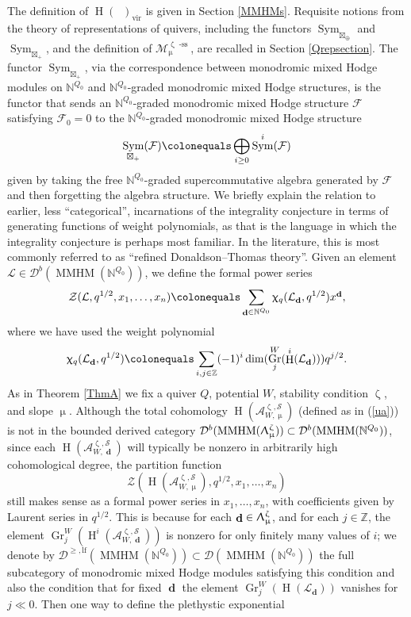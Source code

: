 \documentclass[a4paper,10pt]{amsart}
\renewcommand{\zeta}{\upzeta}
\renewcommand{\chi}{\upchi}
\renewcommand{\Lambda}{\Uplambda}
\renewcommand{\mu}{\upmu}
\DeclareMathOperator{\BC}{B\mathbb{C}^*}
\newcommand{\SP}{\mathcal{S}}
\newcommand{\Msp}{\mathcal{M}}
\newcommand{\GrW}[1]{\Gr^W_{#1}}
\DeclareMathOperator{\sst}{-ss}
\DeclareMathOperator{\MMHM}{MMHM}
\DeclareMathOperator{\Gr}{Gr}
\DeclareMathOperator{\dd}{\mathbf{d}}
\DeclareMathOperator{\Sym}{Sym}
\DeclareMathOperator{\vir}{vir}
\DeclareMathOperator{\HO}{H}
\newcommand{\Dulf}{\mathcal{D}^{\geq, \mathrm{lf}}}
\newcommand{\Db}{\mathcal{D}^{b}}
\newcommand{\Dub}{\mathcal{D}}
\begin{document}
The definition of $\HO(\BC)_{\vir}$ is given in Section \ref{MMHMs}.  Requisite notions from the theory of representations of quivers, including the functors $\Sym_{\boxtimes_{\oplus}}$ and $\Sym_{\boxtimes_{+}}$, and the definition of $\Msp^{\zeta\sst}_{\mu}$, are recalled in Section \ref{Qrepsection}.  The functor $\Sym_{\boxtimes_{+}}$, via the correspondence between monodromic mixed Hodge modules on $\mathbb{N}^{Q_0}$ and $\mathbb{N}^{Q_0}$-graded monodromic mixed Hodge structures, is the functor that sends an $\mathbb{N}^{Q_0}$-graded monodromic mixed Hodge structure $\mathcal{F}$ satisfying $\mathcal{F}_0=0$ to the $\mathbb{N}^{Q_0}$-graded monodromic mixed Hodge structure
\[
\Sym_{\boxtimes_+}(\mathcal{F})\colonequals \bigoplus_{i\geq 0}\Sym^i(\mathcal{F})
\]
given by taking the free $\mathbb{N}^{Q_0}$-graded supercommutative algebra generated by $\mathcal{F}$ and then forgetting the algebra structure.
\smallbreak
We briefly explain the relation to earlier, less ``categorical'', incarnations of the integrality conjecture in terms of generating functions of weight polynomials, as that is the language in which the integrality conjecture is perhaps most familiar.  In the literature, this is most commonly referred to as ``refined Donaldson--Thomas theory''.  Given an element $\mathcal{L}\in\Db(\MMHM(\mathbb{N}^{Q_0}))$, we define the formal power series
\[
\mathcal{Z}(\mathcal{L},q^{1/2},x_1,\ldots,x_n)\colonequals \sum_{\dd\in\mathbb{N}^{Q_0}}\chi_q(\mathcal{L}_{\dd},q^{1/2})x^{\dd},
\]
where we have used the weight polynomial
\[
\chi_q(\mathcal{L}_{\dd},q^{1/2})\colonequals \sum_{i,j\in\mathbb{Z}} (-1)^i\dim(\GrW{j}(\HO^i(\mathcal{L}_{\dd})))q^{j/2}.
\]
As in Theorem \ref{ThmA} we fix a quiver $Q$, potential $W$, stability condition $\zeta$, and slope $\mu$.  Although the total cohomology $\HO(\mathcal{A}_{W,\mu}^{\zeta,\SP})$ (defined as in (\ref{ua})) is not in the bounded derived category $\Db(\MMHM(\Lambda_{\mu}^{\zeta}))\subset \Db(\MMHM(\mathbb{N}^{Q_0}))$, since each $\HO(\mathcal{A}_{W,\dd}^{\zeta,\SP})$ will typically be nonzero in arbitrarily high cohomological degree, the partition function
\[
\mathcal{Z}\left(\HO(\mathcal{A}_{W,\mu}^{\zeta,\SP}),q^{1/2},x_1,\ldots,x_n\right)
\]
still makes sense as a formal power series in $x_1,\ldots,x_n$, with coefficients given by Laurent series in $q^{1/2}$.  This is because for each $\dd\in\Lambda_{\mu}^{\zeta}$, and for each $j\in\mathbb{Z}$, the element $\GrW{j}(\HO^i(\mathcal{A}_{W,\dd}^{\zeta,\SP}))$ is nonzero for only finitely many values of $i$; we denote by $\Dulf(\MMHM(\mathbb{N}^{Q_0}))\subset \Dub(\MMHM(\mathbb{N}^{Q_0}))$ the full subcategory of monodromic mixed Hodge modules satisfying this condition and also the condition that for fixed $\dd$ the element $\GrW{j}(\HO(\mathcal{L}_{\dd}))$ vanishes for $j\ll 0$.  Then one way to define the plethystic exponential
\end{document}
